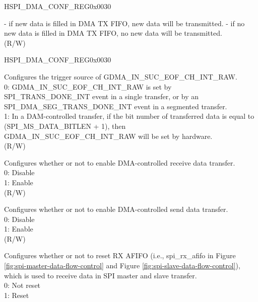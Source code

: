 \begin{register}{H}{SPI\_DMA\_CONF\_REG}{0x0030}
\begin{regdesc}
\begin{reglist}
        - if new data is filled in DMA TX FIFO, new data will be transmitted.
        - if no new data is filled in DMA TX FIFO, no new data will be transmitted.\\
 (R/W)

 \item [Continued on the next page...]
\end{reglist}\end{regdesc}
\end{register}

\addtocounter{Regfloat}{-1}
\begin{register}{H}{SPI\_DMA\_CONF\_REG}{0x0030}
\begin{regdesc}\begin{reglist}
\item [Continued from the previous page...]
\label{fielddesc:SPI3RXEOFEN}\item [SPI\_RX\_EOF\_EN] Configures the trigger source of GDMA\_IN\_SUC\_EOF\_CH\_INT\_RAW.\\
0: GDMA\_IN\_SUC\_EOF\_CH\_INT\_RAW is set by SPI\_TRANS\_DONE\_INT event in a single transfer, or by an SPI\_DMA\_SEG\_TRANS\_DONE\_INT event in a segmented transfer. \\
1: In a DAM-controlled transfer, if the bit number of transferred data is equal to (SPI\_MS\_DATA\_BITLEN + 1), then GDMA\_IN\_SUC\_EOF\_CH\_INT\_RAW will be set by hardware.\\
(R/W)
\label{fielddesc:SPI3DMARXENA}\item [SPI\_DMA\_RX\_ENA] Configures whether or not to enable DMA-controlled receive data transfer.\\
0: Disable\\
1: Enable\\ 
(R/W)
\label{fielddesc:SPI3DMATXENA}\item [SPI\_DMA\_TX\_ENA] Configures whether or not to enable DMA-controlled send data transfer.\\
0: Disable\\
1: Enable\\ 
(R/W)
\label{fielddesc:SPI3RXAFIFORST}\item [SPI\_RX\_AFIFO\_RST] Configures whether or not to reset RX AFIFO (i.e., spi\_rx\_afifo in Figure \ref{fig:spi-master-data-flow-control} and Figure \ref{fig:spi-slave-data-flow-control}), which is used to receive data in SPI master and slave transfer.\\
0: Not reset\\
1: Reset \\

\end{reglist}
\end{regdesc}
\end{register}
